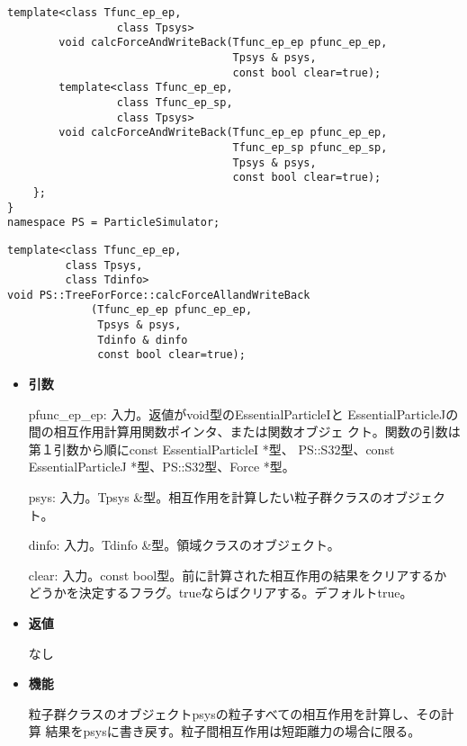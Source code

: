 \begin{lstlisting}[caption=TreeForForce1]
        template<class Tfunc_ep_ep,
                 class Tpsys>
        void calcForceAndWriteBack(Tfunc_ep_ep pfunc_ep_ep,
                                   Tpsys & psys,
                                   const bool clear=true);
        template<class Tfunc_ep_ep,
                 class Tfunc_ep_sp,
                 class Tpsys>
        void calcForceAndWriteBack(Tfunc_ep_ep pfunc_ep_ep,
                                   Tfunc_ep_sp pfunc_ep_sp,
                                   Tpsys & psys,
                                   const bool clear=true);
    };
}
namespace PS = ParticleSimulator;
\end{lstlisting}


\begin{screen}
\begin{verbatim}
template<class Tfunc_ep_ep,
         class Tpsys,
         class Tdinfo>
void PS::TreeForForce::calcForceAllandWriteBack
             (Tfunc_ep_ep pfunc_ep_ep,
              Tpsys & psys,
              Tdinfo & dinfo
              const bool clear=true);
\end{verbatim}
\end{screen}

\begin{itemize}

\item {\bf 引数}

pfunc\_ep\_ep: 入力。返値がvoid型のEssentialParticleIと
EssentialParticleJの間の相互作用計算用関数ポインタ、または関数オブジェ
クト。関数の引数は第１引数から順にconst EssentialParticleI *型、
PS::S32型、const EssentialParticleJ *型、PS::S32型、Force *型。

psys: 入力。Tpsys \&型。相互作用を計算したい粒子群クラスのオブジェクト。

dinfo: 入力。Tdinfo \&型。領域クラスのオブジェクト。

clear: 入力。const bool型。前に計算された相互作用の結果をクリアするか
どうかを決定するフラグ。trueならばクリアする。デフォルトtrue。

\item {\bf 返値}

なし

\item {\bf 機能}

粒子群クラスのオブジェクトpsysの粒子すべての相互作用を計算し、その計算
結果をpsysに書き戻す。粒子間相互作用は短距離力の場合に限る。

\end{itemize}

